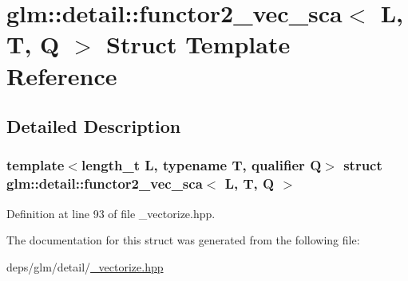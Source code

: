 \hypertarget{structglm_1_1detail_1_1functor2__vec__sca}{}\section{glm\+:\+:detail\+:\+:functor2\+\_\+vec\+\_\+sca$<$ L, T, Q $>$ Struct Template Reference}
\label{structglm_1_1detail_1_1functor2__vec__sca}


\subsection{Detailed Description}
\subsubsection*{template$<$length\+\_\+t L, typename T, qualifier Q$>$\newline
struct glm\+::detail\+::functor2\+\_\+vec\+\_\+sca$<$ L, T, Q $>$}



Definition at line 93 of file \+\_\+vectorize.\+hpp.



The documentation for this struct was generated from the following file\+:\begin{DoxyCompactItemize}
\item 
deps/glm/detail/\hyperlink{__vectorize_8hpp}{\+\_\+vectorize.\+hpp}\end{DoxyCompactItemize}
